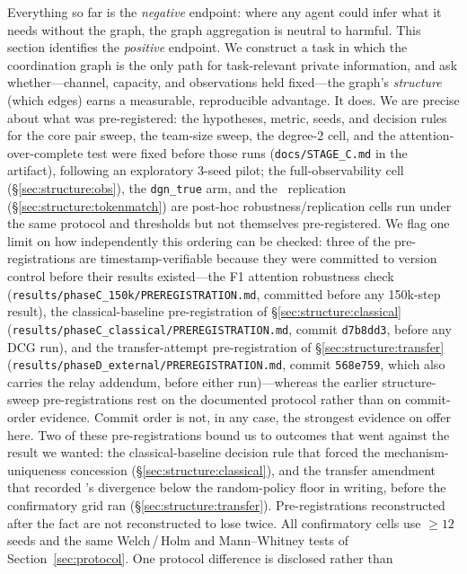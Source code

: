 Everything so far is the \emph{negative} endpoint: where any agent could
infer what it needs without the graph, the graph aggregation is neutral to
harmful. This section identifies the \emph{positive} endpoint. We construct a
task in which the coordination graph is the only path for task-relevant
private information, and ask whether---channel, capacity, and observations
held fixed---the graph's \emph{structure} (which edges) earns a measurable,
reproducible advantage. It does. We are precise about what was
pre-registered: the hypotheses, metric, seeds, and decision rules for the
core pair sweep, the team-size sweep, the degree-2 cell, and the
attention-over-complete test were fixed before those runs
(\texttt{docs/STAGE\_C.md} in the artifact), following an exploratory
3-seed pilot; the full-observability cell
(\S\ref{sec:structure:obs}), the \texttt{dgn\_true} arm, and the
\tokenmatch\ replication (\S\ref{sec:structure:tokenmatch}) are post-hoc
robustness/replication cells run under the same protocol and thresholds but
not themselves pre-registered. We flag one limit on how independently this
ordering can be checked: three of the pre-registrations are timestamp-verifiable
because they were committed to version control before their results existed---the
F1 attention robustness check
(\texttt{results/phaseC\_150k/PREREGISTRATION.md}, committed before any 150k-step
result), the classical-baseline pre-registration of
\S\ref{sec:structure:classical}
(\texttt{results/phaseC\_classical/PREREGISTRATION.md}, commit \texttt{d7b8dd3},
before any DCG run), and the transfer-attempt pre-registration of
\S\ref{sec:structure:transfer}
(\texttt{results/phaseD\_external/PREREGISTRATION.md}, commit \texttt{568e759},
which also carries the relay addendum, before either
run)---whereas the earlier structure-sweep pre-registrations rest
on the documented protocol rather than on commit-order evidence.
Commit order is not, in any case, the strongest evidence on offer here. Two of
these pre-registrations bound us to outcomes that went against the result we
wanted: the classical-baseline decision rule that forced the
mechanism-uniqueness concession (\S\ref{sec:structure:classical}), and the
transfer amendment that recorded \gtrue's divergence below the random-policy
floor in writing, before the confirmatory grid ran
(\S\ref{sec:structure:transfer}). Pre-registrations reconstructed after the
fact are not reconstructed to lose twice. All confirmatory cells use $\ge 12$ seeds and
the same Welch\,/\,Holm and Mann--Whitney tests of
Section~\ref{sec:protocol}. One protocol difference is disclosed rather than
